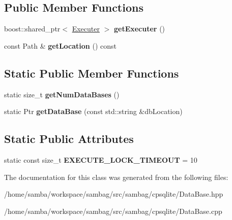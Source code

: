 \subsection*{Public Member Functions}
\begin{DoxyCompactItemize}
\item 
\hypertarget{classsambag_1_1cpsqlite_1_1_data_base_adf84d716bd37733172e8880d54397efc}{
boost::shared\_\-ptr$<$ \hyperlink{classsambag_1_1cpsqlite_1_1_data_base_1_1_executer}{Executer} $>$ {\bfseries getExecuter} ()}
\label{classsambag_1_1cpsqlite_1_1_data_base_adf84d716bd37733172e8880d54397efc}

\item 
\hypertarget{classsambag_1_1cpsqlite_1_1_data_base_a054fa83d4305cd92194f2ce02e88bfb6}{
const Path \& {\bfseries getLocation} () const }
\label{classsambag_1_1cpsqlite_1_1_data_base_a054fa83d4305cd92194f2ce02e88bfb6}

\end{DoxyCompactItemize}
\subsection*{Static Public Member Functions}
\begin{DoxyCompactItemize}
\item 
\hypertarget{classsambag_1_1cpsqlite_1_1_data_base_aaedf91912c3e1d61b31db295259a7253}{
static size\_\-t {\bfseries getNumDataBases} ()}
\label{classsambag_1_1cpsqlite_1_1_data_base_aaedf91912c3e1d61b31db295259a7253}

\item 
\hypertarget{classsambag_1_1cpsqlite_1_1_data_base_ace4c1a3168bb95df382b3b478e0b8397}{
static Ptr {\bfseries getDataBase} (const std::string \&dbLocation)}
\label{classsambag_1_1cpsqlite_1_1_data_base_ace4c1a3168bb95df382b3b478e0b8397}

\end{DoxyCompactItemize}
\subsection*{Static Public Attributes}
\begin{DoxyCompactItemize}
\item 
\hypertarget{classsambag_1_1cpsqlite_1_1_data_base_a5beb5a04609fc43ea07692d46399a094}{
static const size\_\-t {\bfseries EXECUTE\_\-LOCK\_\-TIMEOUT} = 10}
\label{classsambag_1_1cpsqlite_1_1_data_base_a5beb5a04609fc43ea07692d46399a094}

\end{DoxyCompactItemize}


The documentation for this class was generated from the following files:\begin{DoxyCompactItemize}
\item 
/home/samba/workspace/sambag/src/sambag/cpsqlite/DataBase.hpp\item 
/home/samba/workspace/sambag/src/sambag/cpsqlite/DataBase.cpp\end{DoxyCompactItemize}

